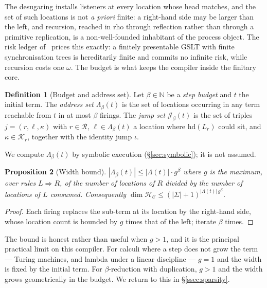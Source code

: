 \documentclass[11pt]{article}
\theoremstyle{definition}
\newtheorem{definition}{Definition}[section]
\theoremstyle{plain}
\newtheorem{proposition}[definition]{Proposition}
\newcommand{\rew}{\Rightarrow}
\newcommand{\Loc}{\Lambda}
\newcommand{\Tags}{\Sigma}
\newcommand{\Cfg}{\mathcal{C}}
\newcommand{\Hs}{\mathcal{H}}
\newcommand{\Hc}{\Hs_{\Cfg}}
\newcommand{\Jumps}{\mathcal{J}}
\begin{document}
The desugaring installs listeners at every location whose head matches, and the set of such
locations is not \emph{a priori} finite: a right-hand side may be larger than the left, and
recursion, reached in rho through reflection rather than through a primitive replication, is a
non-well-founded inhabitant of the process object. The risk ledger of~\cite{knotted} prices
this exactly: a finitely presentable GSLT with finite synchronisation trees is hereditarily
finite and commits no infinite risk, while recursion costs one $\omega$. The budget is what
keeps the compiler inside the finitary core.

\begin{definition}[Budget and address set]\label{def:budget}
Let $\beta \in \mathbb{N}$ be a \emph{step budget} and $t$ the initial term. The
\emph{address set} $\Loc_\beta(t)$ is the set of locations occurring in any term reachable from
$t$ in at most $\beta$ firings. The \emph{jump set} $\Jumps_\beta(t)$ is the set of triples
$j = (r, \ell, \kappa)$ with $r \in \mathcal{R}$, $\ell \in \Loc_\beta(t)$ a location where
$\mathrm{hd}(L_r)$ could sit, and $\kappa \in \mathcal{K}_r$, together with the identity jump
$\iota$.
\end{definition}

We compute $\Loc_\beta(t)$ by symbolic execution (\S\ref{sec:symbolic}); it is not assumed.

\begin{proposition}[Width bound]\label{prop:width}
$|\Loc_\beta(t)| \le |\Loc(t)| \cdot g^\beta$ where $g$ is the maximum, over rules
$L \rew R$, of the number of locations of $R$ divided by the number of locations of $L$
consumed. Consequently $\dim \Hc \le (|\Tags|+1)^{|\Loc(t)|\,g^\beta}$.
\end{proposition}

\begin{proof}
Each firing replaces the sub-term at its location by the right-hand side, whose location count
is bounded by $g$ times that of the left; iterate $\beta$ times.
\end{proof}

The bound is honest rather than useful when $g > 1$, and it is the principal practical limit on
this compiler. For calculi where a step does not grow the term --- Turing machines, and
lambda under a linear discipline --- $g = 1$ and the width is fixed by the initial term. For
$\beta$-reduction with duplication, $g > 1$ and the width grows geometrically in the budget.
We return to this in \S\ref{ssec:sparsity}.
\end{document}
